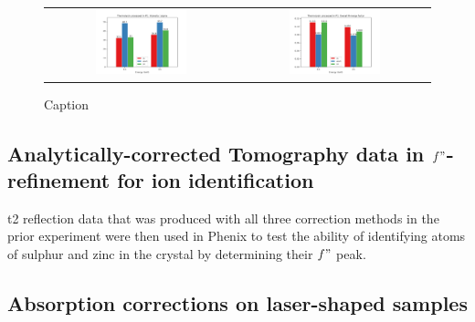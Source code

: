 \begin{figure}[h]
    \centering
    \begin{tabular}{cc}
    \includegraphics[width = 0.5\textwidth]{plots/exp1/tlys_2_P1/I_over_sigma.png} & \includegraphics[width = 0.5\textwidth]{plots/exp1/tlys_2_P1/rmerges.png}
    \end{tabular}
    \caption{Caption}
    \label{fig:tlys_2_p6}
\end{figure}

\subsection{Analytically-corrected Tomography data in $f"$-refinement for ion identification}


\ac{t2} reflection data that was produced with all three correction methods in the prior experiment were then used in Phenix to test the ability of identifying atoms of sulphur and zinc in the crystal by determining their $f"$ peak.

\subsection{Absorption corrections on laser-shaped samples}

